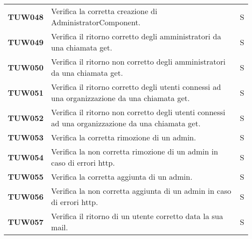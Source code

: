 \documentclass[../../piano-di-qualifica.tex]{subfiles}
\begin{document}
\begin{longtable}[H]{>{\centering\bfseries}m{3cm} >{}m{10cm} >{\centering\arraybackslash}m{3cm}}

  TUW048             & Verifica la corretta creazione di AdministratorComponent.                                                           & S                             \\

  TUW049             & Verifica il ritorno corretto degli amministratori da una chiamata get.                                              & S                             \\

  TUW050             & Verifica il ritorno non corretto degli amministratori da una chiamata get.                                          & S                             \\

  TUW051             & Verifica il ritorno corretto degli utenti connessi ad una organizzazione da una chiamata get.                       & S                             \\

  TUW052             & Verifica il ritorno non corretto degli utenti connessi ad una organizzazione da una chiamata get.                   & S                             \\

  TUW053             & Verifica la corretta rimozione di un admin.                                                                         & S                             \\

  TUW054             & Verifica la non corretta rimozione di un admin in caso di errori http.                                              & S                             \\

  TUW055             & Verifica la corretta aggiunta di un admin.                                                                          & S                             \\

  TUW056             & Verifica la non corretta aggiunta di un admin in caso di errori http.                                               & S                             \\

  TUW057             & Verifica il ritorno di un utente corretto data la sua mail.                                                         & S                             \\


\end{longtable}
\end{document}
